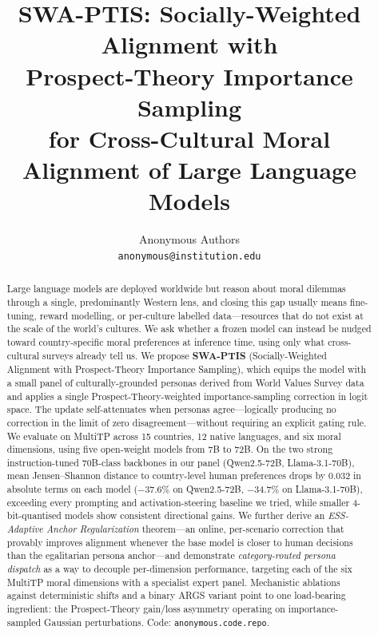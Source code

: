 \documentclass{article}
\title{%
  \textbf{SWA-PTIS}: Socially-Weighted Alignment with\\
  Prospect-Theory Importance Sampling\\
  for Cross-Cultural Moral Alignment of Large Language Models%
}
\author{%
  Anonymous Authors\\
  \texttt{anonymous@institution.edu}
}
\begin{document}
\maketitle

\begin{abstract}
Large language models are deployed worldwide but reason about moral dilemmas through a single, predominantly Western lens, and closing this gap usually means fine-tuning, reward modelling, or per-culture labelled data---resources that do not exist at the scale of the world's cultures. We ask whether a frozen model can instead be nudged toward country-specific moral preferences at inference time, using only what cross-cultural surveys already tell us. We propose \textbf{SWA-PTIS} (Socially-Weighted Alignment with Prospect-Theory Importance Sampling), which equips the model with a small panel of culturally-grounded personas derived from World Values Survey data and applies a single Prospect-Theory-weighted importance-sampling correction in logit space. The update self-attenuates when personas agree---logically producing no correction in the limit of zero disagreement---without requiring an explicit gating rule. We evaluate on MultiTP across 15 countries, 12 native languages, and six moral dimensions, using five open-weight models from 7B to 72B. On the two strong instruction-tuned 70B-class backbones in our panel (Qwen2.5-72B, Llama-3.1-70B), mean Jensen--Shannon distance to country-level human preferences drops by $0.032$ in absolute terms on each model ($-37.6\%$ on Qwen2.5-72B, $-34.7\%$ on Llama-3.1-70B), exceeding every prompting and activation-steering baseline we tried, while smaller 4-bit-quantised models show consistent directional gains. We further derive an \emph{ESS-Adaptive Anchor Regularization} theorem---an online, per-scenario correction that provably improves alignment whenever the base model is closer to human decisions than the egalitarian persona anchor---and demonstrate \emph{category-routed persona dispatch} as a way to decouple per-dimension performance, targeting each of the six MultiTP moral dimensions with a specialist expert panel. Mechanistic ablations against deterministic shifts and a binary ARGS variant point to one load-bearing ingredient: the Prospect-Theory gain/loss asymmetry operating on importance-sampled Gaussian perturbations. Code: \texttt{anonymous.code.repo}.
\end{abstract}
\end{document}
